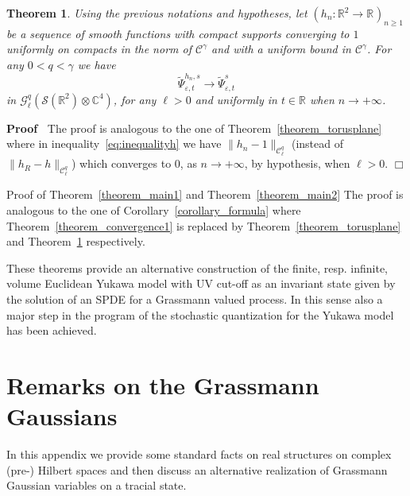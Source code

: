 \documentclass{article}
\newenvironment{proof}{\noindent\textbf{Proof\ }}{\hspace*{\fill}$\Box$\medskip}
\newenvironment{proof*}[1]{\noindent\textbf{#1\ }}{\hspace*{\fill}$\Box$\medskip}
\newtheorem{theorem}{Theorem}
\begin{document}
\begin{theorem}
  \label{theorem_cutoffh}Using the previous notations and hypotheses, let
  $(h_n : \mathbb{R}^2 \rightarrow \mathbb{R}^{}_{})_{n \geqslant 1}$ be a
  sequence of smooth functions with compact supports converging to $1$
  uniformly on compacts in the norm of $\mathcal{C}^{\gamma}$ and with a
  uniform bound in $\mathcal{C}^{\gamma}$. For any $0 < q < \gamma$ we have
  \[ \tilde{\Psi}_{\varepsilon, t}^{h_n, s} \rightarrow
     \tilde{\Psi}_{\varepsilon, t}^s \]
  in $\mathcal{G}^q_{\ell} (\mathcal{S} (\mathbb{R}^2) \otimes \mathbb{C}^4)$,
  for any $\ell > 0$ and uniformly in $t \in \mathbb{R}$ when $n \rightarrow +
  \infty$.
\end{theorem}

\begin{proof}
  The proof is analogous to the one of Theorem~\ref{theorem_torusplane} where
  in inequality~{\eqref{eq:inequalityh}} we have $\| h_n - 1
  \|_{\mathcal{C}^q_{\ell}}$ (instead of $\| h_R - h
  \|_{\mathcal{C}^q_{\ell}}$) which converges to $0$, as $n \rightarrow +
  \infty$, by hypothesis, when $\ell > 0$.
\end{proof}

\begin{proof*}{Proof of Theorem~\ref{theorem_main1} and
Theorem~\ref{theorem_main2}}
  The proof is analogous to the one of Corollary~\ref{corollary_formula} where
  Theorem~\ref{theorem_convergence1} is replaced by
  Theorem~\ref{theorem_torusplane} and Theorem~\ref{theorem_cutoffh}
  respectively.
\end{proof*}

These theorems provide an alternative construction of the finite, resp.
infinite, volume Euclidean Yukawa model with UV cut-off as an invariant state
given by the solution of an SPDE for a Grassmann valued process. In this sense
also a major step in the program of the stochastic quantization for the Yukawa
model has been achieved.

\appendix\section{Remarks on the Grassmann Gaussians}\label{app:GP}

In this appendix we provide some standard facts on real structures on complex
(pre-) Hilbert spaces and then discuss an alternative realization of Grassmann
Gaussian variables on a tracial state.

\
\end{document}
